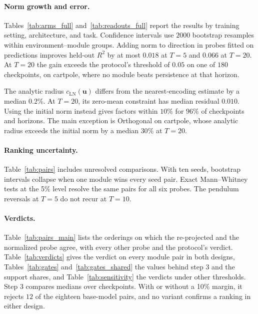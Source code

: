 



\paragraph{Norm growth and error.} Tables~\ref{tab:arms_full} and~\ref{tab:readouts_full} report the results by training setting, architecture, and task. Confidence intervals use $2000$ bootstrap resamples within environment--module groups. Adding norm to direction in probes fitted on predictions improves held-out $R^2$ by at most $0.018$ at $T=5$ and $0.066$ at $T=20$. At $T=20$ the gain exceeds the protocol's threshold of $0.05$ on one of $180$ checkpoints, on cartpole, where no module beats persistence at that horizon.

The analytic radius $c_{\mathrm{LN}}(\mathbf u)$ differs from the nearest-encoding estimate by a median $0.2$\%. At $T=20$, its zero-mean constraint has median residual $0.010$. Using the initial norm instead gives factors within $10$\% for $96$\% of checkpoints and horizons. The main exception is Orthogonal on cartpole, whose analytic radius exceeds the initial norm by a median $30$\% at $T=20$.

\paragraph{Ranking uncertainty.} Table~\ref{tab:pairs} includes unresolved comparisons. With ten seeds, bootstrap intervals collapse when one module wins every seed pair. Exact Mann--Whitney tests at the 5\% level resolve the same pairs for all six probes. The pendulum reversals at $T=5$ do not recur at $T=10$.



\paragraph{Verdicts.} Table~\ref{tab:pairs_main} lists the orderings on which the re-projected and the normalized probe agree, with every other probe and the protocol's verdict. Table~\ref{tab:verdicts} gives the verdict on every module pair in both designs, Tables~\ref{tab:gates} and~\ref{tab:gates_shared} the values behind step 3 and the support shares, and Table~\ref{tab:sensitivity} the verdicts under other thresholds. Step 3 compares medians over checkpoints. With or without a 10\% margin, it rejects $12$ of the eighteen base-model pairs, and no variant confirms a ranking in either design.

